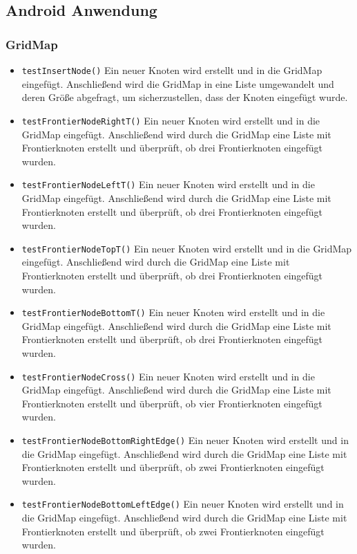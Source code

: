 \documentclass[10pt,a4paper]{article}
\begin{document}
		\subsection{Android Anwendung}
		
			\subsubsection{GridMap}
			\begin{itemize}
				\item \texttt{testInsertNode()} Ein neuer Knoten wird erstellt und in die GridMap eingefügt. Anschließend wird die GridMap in eine Liste umgewandelt und deren Größe 							abgefragt, um sicherzustellen, dass der Knoten eingefügt wurde.
				\item \texttt{testFrontierNodeRightT()} Ein neuer Knoten wird erstellt und in die GridMap eingefügt. Anschließend wird durch die GridMap eine Liste mit Frontierknoten 							erstellt und überprüft, ob drei Frontierknoten eingefügt wurden.
				\item \texttt{testFrontierNodeLeftT()} Ein neuer Knoten wird erstellt und in die GridMap eingefügt. Anschließend wird durch die GridMap eine Liste mit Frontierknoten 							erstellt und überprüft, ob drei Frontierknoten eingefügt wurden.
				\item \texttt{testFrontierNodeTopT()} Ein neuer Knoten wird erstellt und in die GridMap eingefügt. Anschließend wird durch die GridMap eine Liste mit Frontierknoten 							erstellt und überprüft, ob drei Frontierknoten eingefügt wurden.
				\item \texttt{testFrontierNodeBottomT()} Ein neuer Knoten wird erstellt und in die GridMap eingefügt. Anschließend wird durch die GridMap eine Liste mit Frontierknoten 							erstellt und überprüft, ob drei Frontierknoten eingefügt wurden.
				\item \texttt{testFrontierNodeCross()} Ein neuer Knoten wird erstellt und in die GridMap eingefügt. Anschließend wird durch die GridMap eine Liste mit Frontierknoten 							erstellt und überprüft, ob vier Frontierknoten eingefügt wurden.
				\item \texttt{testFrontierNodeBottomRightEdge()} Ein neuer Knoten wird erstellt und in die GridMap eingefügt. Anschließend wird durch die GridMap eine Liste mit 								Frontierknoten erstellt und überprüft, ob zwei Frontierknoten eingefügt wurden.
				\item \texttt{testFrontierNodeBottomLeftEdge()} Ein neuer Knoten wird erstellt und in die GridMap eingefügt. Anschließend wird durch die GridMap eine Liste mit 								Frontierknoten erstellt und überprüft, ob zwei Frontierknoten eingefügt wurden.

\end{itemize}
\end{document}
